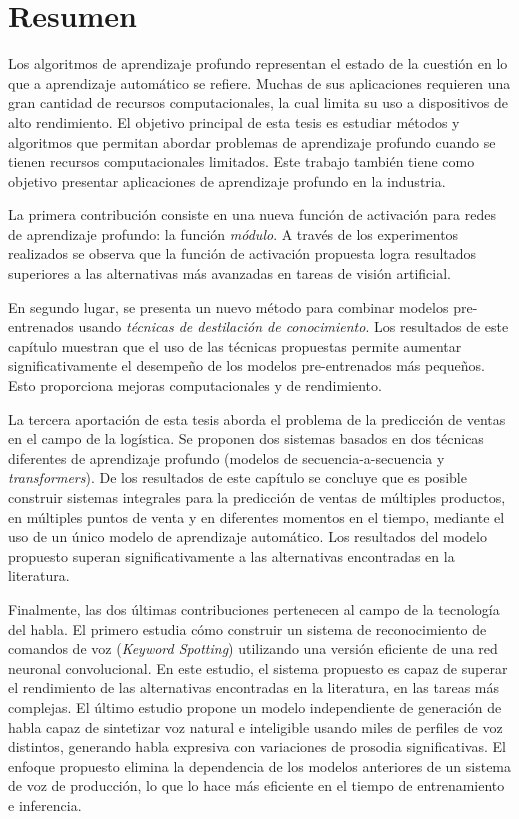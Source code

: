 
\chapter*{Resumen}


Los algoritmos de aprendizaje profundo representan el estado de la cuestión en lo que a aprendizaje automático se refiere. Muchas de sus aplicaciones requieren una gran cantidad de recursos computacionales, la cual limita su uso a dispositivos de alto rendimiento. El objetivo principal de esta tesis es estudiar métodos y algoritmos que permitan abordar problemas de aprendizaje profundo cuando se tienen recursos computacionales limitados. Este trabajo también tiene como objetivo presentar aplicaciones de aprendizaje profundo en la industria.

La primera contribución consiste en una nueva función de activación para redes de aprendizaje profundo: la función \textit{módulo}. A través de los experimentos realizados se observa que la función de activación propuesta logra resultados superiores a las alternativas más avanzadas en tareas de visión artificial.

En segundo lugar, se presenta un nuevo método para combinar modelos pre-entrenados usando \textit{técnicas de destilación de conocimiento}. Los resultados de este capítulo muestran que el uso de las técnicas propuestas permite aumentar significativamente el desempeño de los modelos pre-entrenados más pequeños. Esto proporciona mejoras computacionales y de rendimiento.

La tercera aportación de esta tesis aborda el problema de la predicción de ventas en el campo de la logística. Se proponen dos sistemas basados en dos técnicas diferentes de aprendizaje profundo (modelos de secuencia-a-secuencia y \textit{transformers}). De los resultados de este capítulo se concluye que es posible construir sistemas integrales para la predicción de ventas de múltiples productos, en múltiples puntos de venta y en diferentes momentos en el tiempo, mediante el uso de un único modelo de aprendizaje automático. Los resultados del modelo propuesto superan significativamente a las alternativas encontradas en la literatura.

Finalmente, las dos últimas contribuciones pertenecen al campo de la tecnología del habla. El primero estudia cómo construir un sistema de reconocimiento de comandos de voz (\textit{Keyword Spotting}) utilizando una versión eficiente de una red neuronal convolucional. En este estudio, el sistema propuesto es capaz de superar el rendimiento de las alternativas encontradas en la literatura, en las tareas más complejas. El último estudio propone un modelo independiente de generación de habla capaz de sintetizar voz natural e inteligible usando miles de perfiles de voz distintos, generando habla expresiva con variaciones de prosodia significativas. El enfoque propuesto elimina la dependencia de los modelos anteriores de un sistema de voz de producción, lo que lo hace más eficiente en el tiempo de entrenamiento e inferencia.





\clearpage
